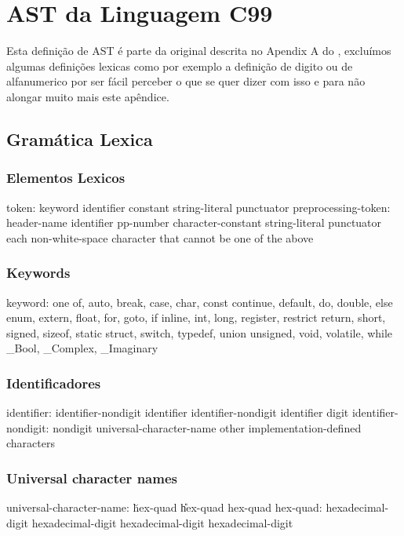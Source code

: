 \chapter{AST da Linguagem \textrm{C99}}\label{chap:ast}
\minitoc
Esta definição de AST é parte da original descrita no Apendix A do \cite{Kernighan:1988:CPL:576122}, excluímos algumas definições lexicas
como por exemplo a definição de digito ou de alfanumerico por ser fácil perceber o que se quer dizer com isso e para não alongar muito mais este apêndice.
\section{Gramática Lexica}
\subsection{Elementos Lexicos}

\begin{code_files}
token:
	keyword
	identifier
	constant
	string-literal
	punctuator
preprocessing-token:
	header-name
	identifier
	pp-number
	character-constant
	string-literal
	punctuator
	each non-white-space character that cannot be one of the above
\end{code_files}

\subsection{Keywords}
\begin{code_files}
keyword:
	one of, auto, break, case, char, const
	continue, default, do, double, else
	enum, extern, float, for, goto, if
	inline, int, long, register, restrict
	return, short, signed, sizeof, static
	struct, switch, typedef, union
	unsigned, void, volatile, while
	_Bool, _Complex, _Imaginary
\end{code_files}

\subsection{Identificadores}
\begin{code_files}
identifier:
	identifier-nondigit
	identifier identifier-nondigit
	identifier digit
identifier-nondigit:
	nondigit
	universal-character-name
	other implementation-defined characters
\end{code_files}

\subsection{Universal character names}
\begin{code_files}
universal-character-name:
	\u hex-quad
	\U hex-quad hex-quad
hex-quad:
	hexadecimal-digit hexadecimal-digit
	hexadecimal-digit hexadecimal-digit
\end{code_files}

